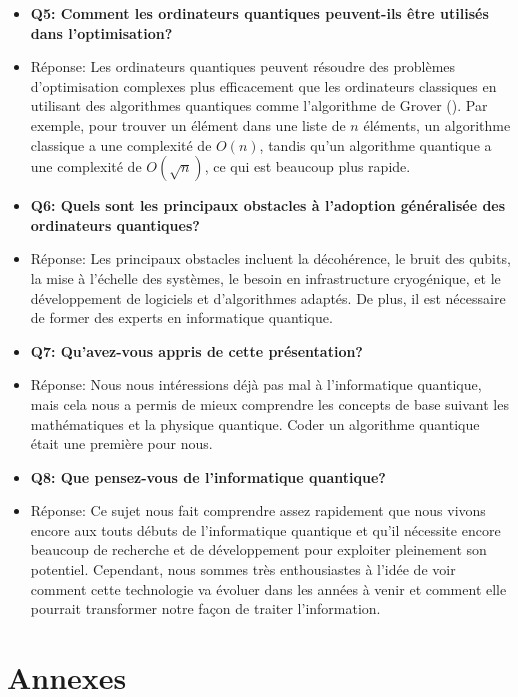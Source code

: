 \documentclass{article}
\begin{document}
\begin{itemize}
  \item \textbf{Q5: Comment les ordinateurs quantiques peuvent-ils être utilisés dans l'optimisation?}
  \item Réponse: Les ordinateurs quantiques peuvent résoudre des problèmes d'optimisation complexes plus efficacement que les ordinateurs classiques en utilisant des algorithmes quantiques comme l'algorithme de Grover (\cite{wikipediaAlgorithmeGrover}). Par exemple, pour trouver un élément dans une liste de $n$ éléments, un algorithme classique a une complexité de $O(n)$, tandis qu'un algorithme quantique a une complexité de $O(\sqrt{n})$, ce qui est beaucoup plus rapide.
  
  \item \textbf{Q6: Quels sont les principaux obstacles à l'adoption généralisée des ordinateurs quantiques?}
  \item Réponse: Les principaux obstacles incluent la décohérence, le bruit des qubits, la mise à l'échelle des systèmes, le besoin en infrastructure cryogénique, et le développement de logiciels et d'algorithmes adaptés. De plus, il est nécessaire de former des experts en informatique quantique.
  
  \item \textbf{Q7: Qu'avez-vous appris de cette présentation?}
  \item Réponse: Nous nous intéressions déjà pas mal à l'informatique quantique, mais cela nous a permis de mieux comprendre les concepts de base suivant les mathématiques et la physique quantique. Coder un algorithme quantique était une première pour nous.
  
  \item \textbf{Q8: Que pensez-vous de l'informatique quantique?}
  \item Réponse: Ce sujet nous fait comprendre assez rapidement que nous vivons encore aux touts débuts de l'informatique quantique et qu'il nécessite encore beaucoup de recherche et de développement pour exploiter pleinement son potentiel. Cependant, nous sommes très enthousiastes à l'idée de voir comment cette technologie va évoluer dans les années à venir et comment elle pourrait transformer notre façon de traiter l'information.
\end{itemize}

\break\section{Annexes}
\end{document}
